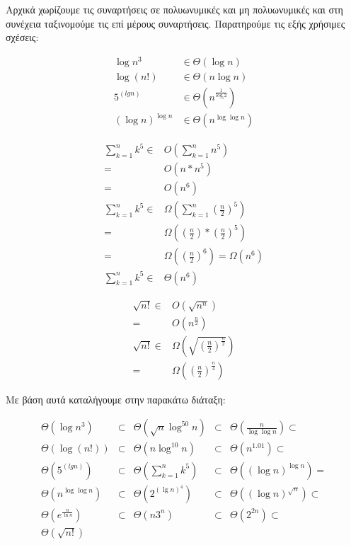 \documentclass[11pt,a4paper]{book}
\begin{document}
Αρχικά χωρίζουμε τις συναρτήσεις σε πολυωνυμικές και μη πολυωνυμικές και στη συνέχεια ταξινομούμε τις επί μέρους συναρτήσεις. Παρατηρούμε τις εξής χρήσιμες σχέσεις:

\begin{align*}
\log n^3 &\in \Theta( \log n )\\
\log( n! ) &\in \Theta( n \log n )\\
5^{(lg n)} &\in \Theta( n^{\frac{1}{log_5 2}} )\\
(\log n)^{\log n} &\in \Theta( n^{\log \log n} )
\end{align*}

\begin{align*}
\sum_{k=1}^n k^5 \in & O( \sum_{k=1}^n n^5 )\\
= & O( n*n^5 )\\
= & O( n^6 ) \\
\sum_{k=1}^n k^5 \in & \Omega( \sum_{k=1}^n (\frac{n}{2})^5 )\\
= & \Omega( (\frac{n}{2}) * (\frac{n}{2})^5 )\\
= & \Omega( (\frac{n}{2})^6 ) = \Omega( n^6 ) \\
\sum_{k=1}^n k^5 \in & \Theta( n^6 )
\end{align*}

\begin{align*}
\sqrt{n!} \in & O( \sqrt{ n^n } )\\
= & O( n^{\frac{n}{2}} )\\
\sqrt{n!} \in & \Omega( \sqrt{ ( \frac{n}{2} )^{ \frac{n}{2} } } ) \\
= & \Omega( (\frac{n}{2})^{\frac{n}{4}} )
\end{align*}

Με βάση αυτά καταλήγουμε στην παρακάτω διάταξη:

\begin{align*}
\Theta( \log n^3 ) &\subset& \Theta( \sqrt n \log^{50} n ) &\subset& \Theta( \frac{n}{\log \log n} )\subset \\
\Theta(\log( n! )) &\subset& \Theta( n \log^{10} n ) &\subset& \Theta( n^{1.01} )\subset \\
\Theta( 5^{(lg n)} ) &\subset& \Theta( \sum_{k=1}^n k^5 ) &\subset& \Theta( (\log n)^{\log n} ) = \\
\Theta( n^{\log \log n} ) &\subset& \Theta( 2^{(\lg n)^4} ) &\subset& \Theta( (\log n)^{\sqrt n} ) \subset\\
\Theta( e^{\frac{n}{\ln n}} ) &\subset& \Theta( n {3^n} ) &\subset& \Theta( 2^{2n} ) \subset\\
\Theta( \sqrt{n!} )
\end{align*}
\end{document}
